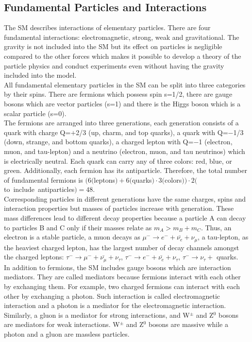 \subsection{Fundamental Particles and Interactions}
\label{sec:Intro_FundParticles}

The SM describes interactions of elementary particles. There are four fundamental interactions: electromagnetic, strong, weak and gravitational. The gravity is not included into the SM but its effect on particles is negligible compared to the other forces which makes it possible to develop a theory of the particle physics and conduct experiments even without having the gravity included into the model.\\ 

All fundamental elementary particles in the SM can be split into three categories by their spins. There are fermions which possess spin s=1/2, there are gauge bosons which are vector particles (s=1) and there is the Higgs boson which is a scalar particle (s=0). \\

The fermions are arranged into three generations, each generation consists of a quark with charge Q=$+$2/3 (up, charm, and top quarks), a quark with Q=$-$1/3 (down, strange, and bottom quarks), a charged lepton with Q=$-$1 (electron, muon, and tau-lepton) and a neutrino (electron, muon, and tau neutrinos) which is electrically neutral. Each quark can carry any of three colors: red, blue, or green. Additionally, each fermion has its antiparticle. Therefore, the total number of fundamental fermions is $(6 ($leptons$)+6 ($quarks$) \cdot 3 ($colors$) ) \cdot 2 ($to~include~antiparticles$) = 48$.\\ 

Corresponding particles in different generations have the same charges, spins and interaction properties but masses of particles increase with generation. These mass differences lead to different decay properties because a particle A can decay to particles B and C only if their masses relate as $m_A > m_B + m_C$. Thus, an electron is a stable particle, a muon decays as $\mu^- \rightarrow e^- + \bar{\nu_e} + \nu_\mu$, a tau-lepton, as the heaviest charged lepton, has the largest number of decay channels amongst the charged leptons: $\tau^- \rightarrow \mu^- + \bar{\nu_\mu} + \nu_\tau$, $\tau^- \rightarrow e^- + \bar{\nu_e} + \nu_\tau$,  $\tau^- \rightarrow \nu_\tau +$ quarks. \\

In addition to fermions, the SM includes gauge bosons which are interaction mediators. They are called mediators because fermions interact with each other by exchanging them. For example, two charged fermions can interact with each other by exchanging a photon. Such interaction is called electromagnetic interaction and a photon is a mediator for the electromagnetic interaction. Similarly, a gluon is a mediator for strong interactions, and W$^{\pm}$ and Z$^0$ bosons are mediators for weak interactions. W$^{\pm}$ and Z$^0$ bosons are massive while a photon and a gluon are massless particles. \\

